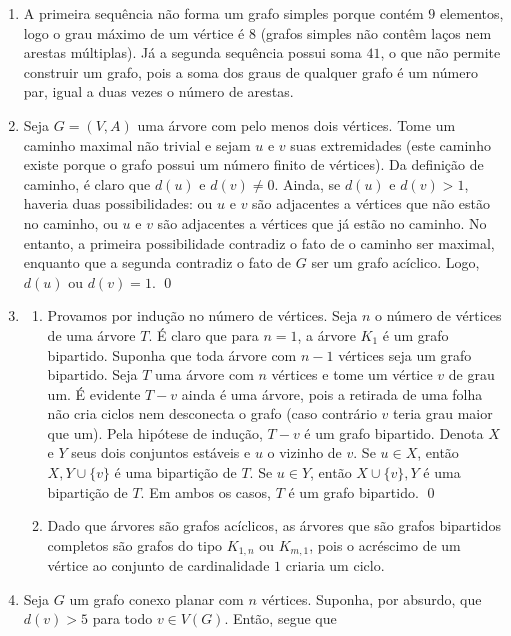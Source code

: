 \documentclass{article}
\begin{document}
\begin{enumerate}
    \item [\textbf{E5}] 
        A primeira sequência não forma um grafo simples porque contém \(9\) elementos, logo o grau máximo de um vértice é \(8\) (grafos simples não contêm laços nem arestas múltiplas). Já a segunda sequência possui soma \(41\), o que não permite construir um grafo, pois a soma dos graus de qualquer grafo é um número par, igual a duas vezes o número de arestas.
    \item [\textbf{E6}] 
        Seja \(G=(V,A)\) uma árvore com pelo menos dois vértices. Tome um caminho maximal não trivial e sejam \(u\) e \(v\) suas extremidades (este caminho existe porque o grafo possui um número finito de vértices). 
        Da definição de caminho, é claro que \(d(u)\) e \(d(v) \neq 0\). Ainda, se \(d(u)\) e \(d(v) > 1\), haveria duas possibilidades: ou \(u\) e \(v\) são adjacentes a vértices que não estão no caminho, ou \(u\) e \(v\) são adjacentes a vértices que já estão no caminho.
        No entanto, a primeira possibilidade contradiz o fato de o caminho ser maximal, enquanto que a segunda contradiz o fato de \(G\) ser um grafo acíclico. Logo, \(d(u)\) ou \(d(v)=1\). \qed
    \item [\textbf{E7}]
        \begin{enumerate}
            \item [(a)] Provamos por indução no número de vértices. Seja \(n\) o número de vértices de uma árvore \(T\). É claro que para \(n=1\), a árvore \(K_1\) é um grafo bipartido. Suponha que toda árvore com \(n-1\) vértices seja um grafo bipartido. Seja \(T\) uma árvore com \(n\) vértices e tome um vértice \(v\) de grau um. 
                É evidente \(T-v\) ainda é uma árvore, pois a retirada de uma folha não cria ciclos nem desconecta o grafo (caso contrário \(v\) teria grau maior que um). Pela hipótese de indução, \(T-v\) é um grafo bipartido. Denota \(X\) e \(Y\) seus dois conjuntos estáveis e \(u\) o vizinho de \(v\). Se \(u \in X\), então \(X, Y \cup \{v\}\) é uma bipartição de \(T\). Se \(u \in Y\), então \(X \cup \{v\}, Y\) é uma bipartição de \(T\). Em ambos os casos, \(T\) é um grafo bipartido. \qed
            \item [(b)] Dado que árvores são grafos acíclicos, as árvores que são grafos bipartidos completos são grafos do tipo \(K_{1,n}\) ou \(K_{m,1}\), pois o acréscimo de um vértice ao conjunto de cardinalidade \(1\) criaria um ciclo.
        \end{enumerate}
    \item [\textbf{E8}] 
        Seja \(G\) um grafo conexo planar com \(n\) vértices. Suponha, por absurdo, que \(d(v) > 5\) para todo \(v \in V(G)\). Então, segue que 

\end{enumerate}
\end{document}

